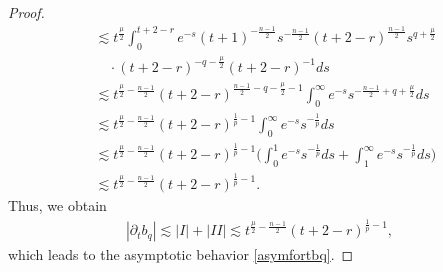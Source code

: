 \documentclass[review]{elsarticle}
\newtheorem{proof}{Proof}[section]
\begin{document}
\begin{proof}
\begin{equation}
\begin{aligned}
&\lesssim t^{\frac{\mu}{2}}\int_{0}^{t+2-r}e^{-s}(t+1)^{-\frac{n-1}{2}}s^{-\frac{n-1}{2}}(t+2-r)^{\frac{n-1}{2}}s^{q+\frac{\mu}{2}}\\
&\quad\cdot(t+2-r)^{-q-\frac{\mu}{2}}(t+2-r)^{-1}ds\\
&\lesssim t^{\frac{\mu}{2}-\frac{n-1}{2}}(t+2-r)^{\frac{n-1}{2}-q-\frac{\mu}{2}-1}\int_{0}^{\infty}e^{-s}s^{-\frac{n-1}{2}+q+\frac{\mu}{2}}ds\\
&\lesssim t^{\frac{\mu}{2}-\frac{n-1}{2}}(t+2-r)^{\frac{1}{p}-1}\int_{0}^{\infty}e^{-s}s^{-\frac{1}{p}}ds\\
&\lesssim t^{\frac{\mu}{2}-\frac{n-1}{2}}(t+2-r)^{\frac{1}{p}-1}\bigg(\int_{0}^{1}e^{-s}s^{-\frac{1}{p}}ds+\int_{1}^{\infty}e^{-s}s^{-\frac{1}{p}}ds\bigg)\\
&\lesssim t^{\frac{\mu}{2}-\frac{n-1}{2}}(t+2-r)^{\frac{1}{p}-1}.
\end{aligned}
\end{equation}
Thus, we obtain
\begin{equation}
\begin{aligned}
|\partial_tb_q|\lesssim |I|+|II|\lesssim t^{\frac{\mu}{2}-\frac{n-1}{2}}(t+2-r)^{\frac{1}{p}-1},
\end{aligned}
\end{equation}
which leads to the asymptotic behavior \eqref{asymfortbq}.
\end{proof}
\end{document}
